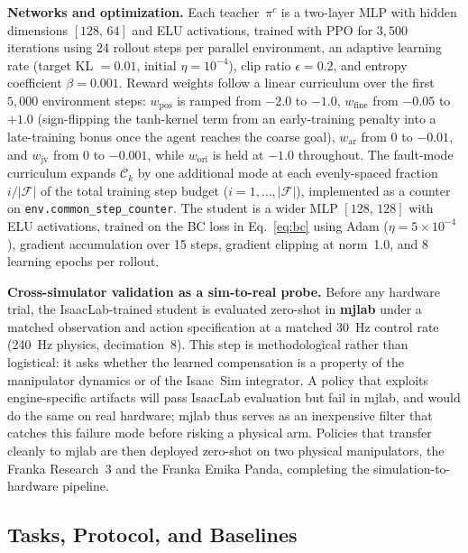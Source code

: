 \documentclass{article}
\begin{document}
		\textbf{Networks and optimization.} Each teacher~$\pi^c$ is a two-layer MLP
		with hidden dimensions $[128,\,64]$ and ELU activations, trained with PPO for
		$3{,}500$ iterations using 24 rollout steps per parallel environment, an
		adaptive learning rate (target KL $=0.01$, initial $\eta=10^{-4}$), clip ratio
		$\epsilon=0.2$, and entropy coefficient $\beta=0.001$. Reward weights follow a linear
		curriculum over the first $5{,}000$ environment steps: $w_\mathrm{pos}$ is ramped from
		$-2.0$ to $-1.0$, $w_\mathrm{fine}$ from $-0.05$ to $+1.0$ (sign-flipping the tanh-kernel
		term from an early-training penalty into a late-training bonus once the agent reaches the
		coarse goal), $w_\mathrm{ar}$ from $0$ to $-0.01$, and $w_\mathrm{jv}$ from $0$ to
		$-0.001$, while $w_\mathrm{ori}$ is held at $-1.0$ throughout. The fault-mode curriculum
		expands $\mathcal{C}_k$ by one additional mode at each evenly-spaced fraction
		$i/|\mathcal{F}|$ of the total training step budget ($i=1,\ldots,|\mathcal{F}|$),
		implemented as a counter on \texttt{env.common\_step\_counter}. The student is a wider
		MLP $[128,\,128]$ with ELU activations, trained on the BC loss in
		Eq.~\ref{eq:bc} using Adam ($\eta=5\times 10^{-4}$), gradient accumulation
		over 15 steps, gradient clipping at norm~1.0, and 8 learning epochs per
		rollout.

		\textbf{Cross-simulator validation as a sim-to-real probe.} Before any
		hardware trial, the IsaacLab-trained student is evaluated zero-shot in
		\textbf{mjlab} under a matched observation and action
		specification at a matched 30~Hz control rate (240~Hz physics, decimation~8).
		This step is methodological rather than logistical: it asks whether the
		learned compensation is a property of the manipulator dynamics or of the
		Isaac~Sim integrator. A policy that exploits engine-specific artifacts will
		pass IsaacLab evaluation but fail in mjlab, and would do the same on real
		hardware; mjlab thus serves as an inexpensive filter that catches this
		failure mode before risking a physical arm. Policies that transfer cleanly to
		mjlab are then deployed zero-shot on two physical manipulators, the Franka
		Research~3 and the Franka Emika Panda, completing the simulation-to-hardware
		pipeline.

\subsection{Tasks, Protocol, and Baselines}
\end{document}
